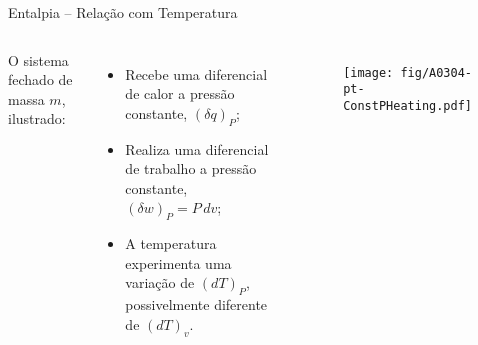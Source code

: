     \begin{frame}{Entalpia -- Relação com Temperatura}\vspace*{-2em}
        \begin{columns}
            O sistema fechado de massa \alert{$m$}, ilustrado:\\[\smallskipamount]
            \begin{itemize}
                \item<1-> Recebe uma diferencial de calor a pressão  constante,  \alert{$(\delta
                    q)_P$};
                \item<2->  Realiza  uma   diferencial   de   trabalho   a   pressão   constante,
                    \alert{$(\delta w)_P = P\,dv$};
                \item<3->  A  temperatura  experimenta   uma   variação   de   \alert{$(dT)_P$},
                    possivelmente diferente de $(dT)_v$.
            \end{itemize}
            \begin{figure}
                \texttt{[image: fig/A0304-pt-ConstPHeating.pdf]}
            \end{figure}
        \end{columns}
    \end{frame}

